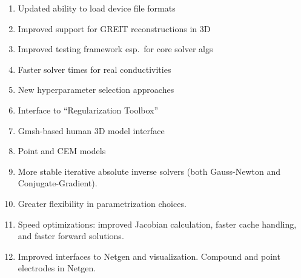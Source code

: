 \documentclass[10pt,letterpaper]{article}
\begin{document}
\begin{multicols}{2}
\begin{enumerate}
\item Updated ability to load device file formats

\item Improved support for GREIT reconstructions in 3D

\item Improved testing framework esp.\ for core solver algs

\item Faster solver times for real conductivities

\item New hyperparameter selection approaches

\item Interface to ``Regularization Toolbox'' \cite{Hansen}

\item Gmsh-based human 3D model interface

\item Point and CEM models


\item More stable
  iterative absolute inverse solvers (both Gauss-Newton and
  Conjugate-Gradient).

\item Greater flexibility in parametrization choices.


\item Speed optimizations: improved Jacobian calculation, faster cache handling, and 
  faster forward solutions.


\item Improved interfaces to Netgen and visualization.
      Compound and point electrodes in Netgen.


\end{enumerate}
\end{multicols}
\end{document}
